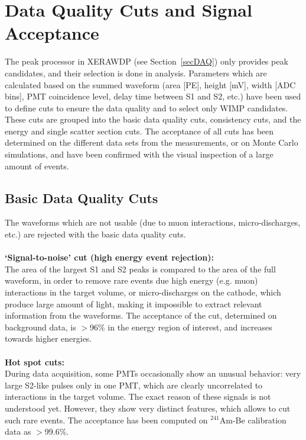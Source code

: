 \section{Data Quality Cuts and Signal Acceptance}
\label{secDataQualityCuts}

The peak processor in XERAWDP (see Section~\ref{secDAQ}) only provides peak candidates, and their selection is done in analysis. 
Parameters which are calculated based on the summed waveform (area [PE], height [mV], width [ADC bins], PMT coincidence level, delay time between S1 and S2, etc.) have been used to define cuts to ensure the data quality and to select only WIMP candidates. These cuts are grouped into the basic data quality cuts, consistency cuts, and the energy and single scatter section cuts. The acceptance of all cuts has been determined on the different data sets from the measurements, or on Monte Carlo simulations, and have been confirmed with the visual inspection of a large amount of events.



\subsection{Basic Data Quality Cuts}
\label{secBasicCuts}
The waveforms which are not usable (due to muon interactions, micro-discharges, etc.) are rejected with the basic data quality cuts. \\
\\
{\bf `Signal-to-noise' cut (high energy event rejection):} \\
The area of the largest S1 and S2 peaks is compared to the area of the full waveform, in order to remove rare events due high energy (e.g. muon) interactions in the target volume, or micro-discharges on the cathode, which produce large amount of light, making it impossible to extract relevant information from the waveforms. The acceptance of the cut, determined on background data, is $>$96\% in the energy region of interest, and increases towards higher energies.
\\
\\
{\bf Hot spot cuts:}\\
During data acquisition, some PMTs occasionally show an unusual behavior: very large S2-like pulses only in one PMT, which are clearly uncorrelated to interactions in the target volume. The exact reason of these signals is not understood yet. However, they show very distinct features, which allows to cut such rare events. The acceptance has been computed on $^{241}$Am-Be calibration data as $>$99.6\%.



